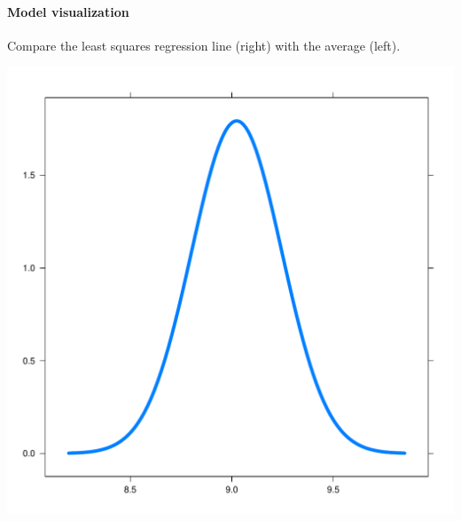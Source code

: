 \documentclass[10pt]{article}\usepackage[]{graphicx}\usepackage[]{color}
\makeatletter
\def\maxwidth{ %
  \ifdim\Gin@nat@width>\linewidth
    \linewidth
  \else
    \Gin@nat@width
  \fi
}
\newenvironment{knitrout}{}{} %
\makeatother
\begin{document}
\paragraph{Model visualization}

Compare the least squares regression line (right) with the average (left).

\begin{knitrout}
\color{fgcolor}
\includegraphics[width=\maxwidth]{figure/unnamed-chunk-3-1} 

\end{knitrout}
\end{document}
